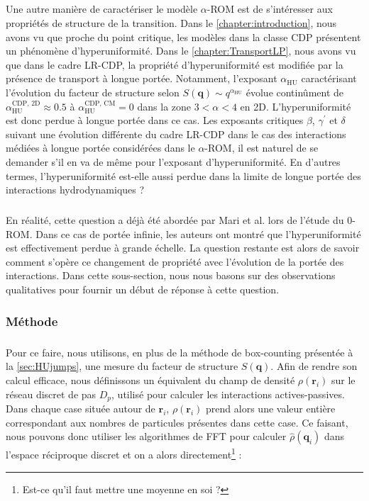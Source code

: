 \subparagraph{}Une autre manière de caractériser le modèle $\alpha$-ROM est de s'intéresser aux propriétés de structure de la transition. Dans le \autoref{chapter:introduction}, nous avons vu que proche du point critique, les modèles dans la classe CDP présentent un phénomène d'hyperuniformité. Dans le \autoref{chapter:TransportLP}, nous avons vu que dans le cadre LR-CDP, la propriété d'hyperuniformité est modifiée par la présence de transport à longue portée. Notamment, l'exposant $\alpha_\text{HU}$ caractérisant l'évolution du facteur de structure selon $S(\mathbf{q})\sim q^{\alpha_\text{HU}}$ évolue continûment de $\alpha_\text{HU}^\text{CDP, 2D}\approx 0.5$ à $\alpha_\text{HU}^\text{CDP, CM} = 0$ dans la zone $3<\alpha<4$ en 2D. L'hyperuniformité est donc perdue à longue portée dans ce cas. Les exposants critiques $\beta$, $\gamma^\prime$ et $\delta$ suivant une évolution différente du cadre LR-CDP dans le cas des interactions médiées à longue portée considérées dans le $\alpha$-ROM, il est naturel de se demander s'il en va de même pour l'exposant d'hyperuniformité. En d'autres termes, l'hyperuniformité est-elle aussi perdue dans la limite de longue portée des interactions hydrodynamiques ? 

\subparagraph{}En réalité, cette question a déjà été abordée par Mari et al. \cite{mari_absorbing_2022} lors de l'étude du 0-ROM. Dans ce cas de portée infinie, les auteurs ont montré que l'hyperuniformité est effectivement perdue à grande échelle. La question restante est alors de savoir comment s'opère ce changement de propriété avec l'évolution de la portée des interactions. Dans cette sous-section, nous nous basons sur des observations qualitatives pour fournir un début de réponse à cette question.

\subsubsection{Méthode}

\subparagraph{}Pour ce faire, nous utilisons, en plus de la méthode de box-counting présentée à la \autoref{sec:HUjumps}, une mesure du facteur de structure $S(\mathbf{q})$. Afin de rendre son calcul efficace, nous définissons un équivalent du champ de densité $\rho(\mathbf{r}_i)$ sur le réseau discret de pas $D_p$, utilisé pour calculer les interactions actives-passives. Dans chaque case située autour de $\mathbf{r}_i$, $\rho(\mathbf{r}_i)$ prend alors une valeur entière correspondant aux nombres de particules présentes dans cette case. Ce faisant, nous pouvons donc utiliser les algorithmes de FFT pour calculer $\hat{\rho}(\mathbf{q}_i)$ dans l'espace réciproque discret et on a alors directement\footnote{Est-ce qu'il faut mettre une moyenne en soi ?} :

